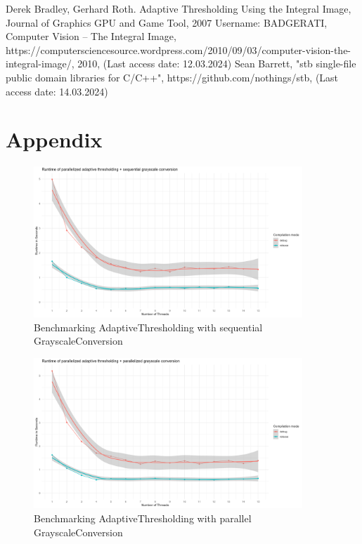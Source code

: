 \documentclass[sigconf]{acmart}
\begin{document}
\begin{thebibliography}{h}
Derek Bradley, Gerhard Roth. Adaptive Thresholding Using the Integral Image, Journal of Graphics GPU and Game Tool, 2007
Username: BADGERATI, Computer Vision – The Integral Image, https://computersciencesource.wordpress.com/2010/09/03/computer-vision-the-integral-image/, 2010, (Last access date: 12.03.2024)
Sean Barrett, "stb single-file public domain libraries for C/C++", https://github.com/nothings/stb, (Last access date: 14.03.2024)

\end{thebibliography}

\newpage

\onecolumn
\section{Appendix}

\begin{figure}[h]
  \centering
  \includegraphics[width=0.9\textwidth]{./graphics/paralleladaptive_sequentialgrayscale_benchmark.png}
  \caption{Benchmarking AdaptiveThresholding with sequential GrayscaleConversion} 
\end{figure}

\begin{figure}[h]
  \centering
  \includegraphics[width=0.9\textwidth]{./graphics/paralleladaptive_parallelgrayscale_benchmark.png}
  \caption{Benchmarking AdaptiveThresholding with parallel GrayscaleConversion} 
\end{figure}
\end{document}
